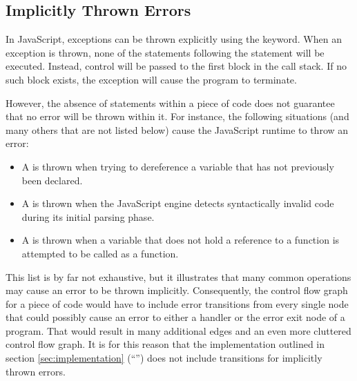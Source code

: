 \pagebreak
\subsection{Implicitly Thrown Errors}
\label{sec:implicitly-thrown-errors}

In JavaScript, exceptions can be thrown explicitly using the  keyword. When an exception is thrown, none of the statements following the  statement will be executed. Instead, control will be passed to the first  block in the call stack. If no such  block exists, the exception will cause the program to terminate. \cite{mdn-throw}

However, the absence of  statements within a piece of code does not guarantee that no error will be thrown within it. For instance, the following situations (and many others that are not listed below) cause the JavaScript runtime to throw an error:

\begin{itemize}
  \item A  is thrown when trying to dereference a variable that has not previously been declared. \cite{mdn-referencerror}
  \item A  is thrown when the JavaScript engine detects syntactically invalid code during its initial parsing phase. \cite{mdn-syntaxerror}
  \item A  is thrown when a variable that does not hold a reference to a function is attempted to be called as a function. \cite{mdn-typeerror}
\end{itemize}

This list is by far not exhaustive, but it illustrates that many common operations may cause an error to be thrown implicitly. Consequently, the control flow graph for a piece of code would have to include error transitions from every single node that could possibly cause an error to either a  handler or the error exit node of a program. That would result in many additional edges and an even more cluttered control flow graph. It is for this reason that the implementation outlined in section \ref{sec:implementation} (``'') does not include transitions for implicitly thrown errors.
